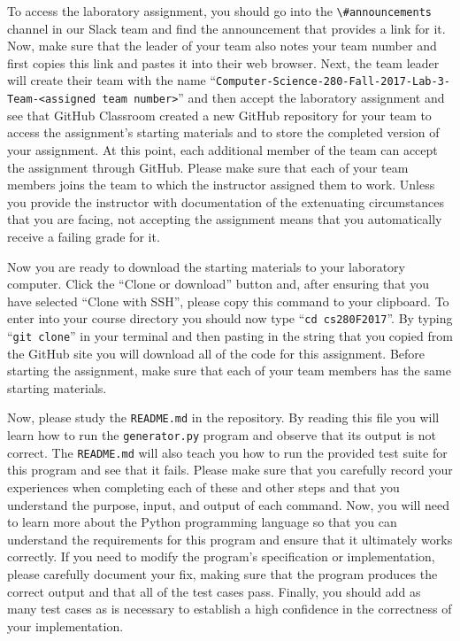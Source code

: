 \documentclass[11pt]{article}
\newcommand{\mainprogram}{\lstinline{generator.py}}
\newcommand{\reflection}{\lstinline{README.md}}
\newcommand{\command}[1]{``\lstinline{#1}''}
\newcommand{\channel}[1]{\lstinline{#1}}
\begin{document}
To access the laboratory assignment, you should go into the \channel{\#announcements} channel in our Slack team and find
the announcement that provides a link for it. Now, make sure that the leader of your team also notes your team number
and first copies this link and pastes it into their web browser. Next, the team leader will create their team with the
name \command{Computer-Science-280-Fall-2017-Lab-3-Team-<assigned team number>} and then accept the laboratory
assignment and see that GitHub Classroom created a new GitHub repository for your team to access the assignment's
starting materials and to store the completed version of your assignment. At this point, each additional member of the
team can accept the assignment through GitHub. Please make sure that each of your team members joins the team to which
the instructor assigned them to work. Unless you provide the instructor with documentation of the extenuating
circumstances that you are facing, not accepting the assignment means that you automatically receive a failing grade for
it.

Now you are ready to download the starting materials to your laboratory computer. Click the ``Clone or download'' button
and, after ensuring that you have selected ``Clone with SSH'', please copy this command to your clipboard. To enter into
your course directory you should now type \command{cd cs280F2017}. By typing \command{git clone} in your terminal and
then pasting in the string that you copied from the GitHub site you will download all of the code for this assignment.
Before starting the assignment, make sure that each of your team members has the same starting materials.

Now, please study the \reflection{} in the repository. By reading this file you will learn how to run the \mainprogram{}
program and observe that its output is not correct. The \reflection{} will also teach you how to run the provided test
suite for this program and see that it fails. Please make sure that you carefully record your experiences when
completing each of these and other steps and that you understand the purpose, input, and output of each command. Now,
you will need to learn more about the Python programming language so that you can understand the requirements for this
program and ensure that it ultimately works correctly. If you need to modify the program's specification or
implementation, please carefully document your fix, making sure that the program produces the correct output and that
all of the test cases pass. Finally, you should add as many test cases as is necessary to establish a high confidence in
the correctness of your implementation.
\end{document}
